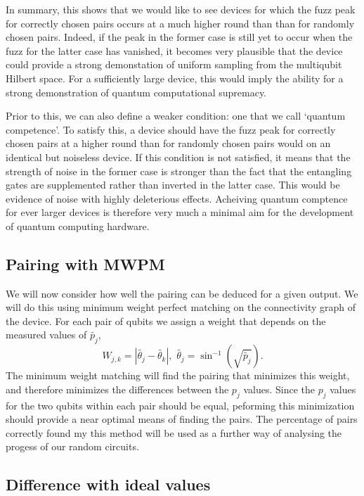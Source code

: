 \documentclass[aps,prl,twocolumn,showpacs,preprintnumbers]{revtex4-1}
\newcommand{\be}{\begin{equation}}
\newcommand{\ee}{\end{equation}}
\begin{document}
In summary, this shows that we would like to see devices for which the fuzz peak for correctly chosen pairs occurs at a much higher round than than for randomly chosen pairs. Indeed, if the peak in the former case is still yet to occur when the fuzz for the latter case has vanished, it becomes very plausible that the device could provide a strong demonstation of uniform sampling from the multiqubit Hilbert space. For a sufficiently large device, this would imply the ability for a strong demonstration of quantum computational supremacy.

Prior to this, we can also define a weaker condition: one that we call `quantum competence’. To satisfy this, a device should have the fuzz peak for correctly chosen pairs at a higher round than for randomly chosen pairs would on an identical but noiseless device. If this condition is not satisfied, it means that the strength of noise in the former case is stronger than the fact that the entangling gates are supplemented rather than inverted in the latter case. This would be evidence of noise with highly deleterious effects. Acheiving quantum comptence for ever larger devices is therefore very much a minimal aim for the development of quantum computing hardware.

\subsection{Pairing with MWPM}

We will now consider how well the pairing can be deduced for a given output. We will do this using minimum weight perfect matching on the connectivity graph of the device. For each pair of qubits we assign a weight that depends on the measured values of $\tilde{p_j}$,
\be \label{angle}
W_{j,k} = | \tilde{\theta_j} - \tilde{\theta_k} |, \,\, \tilde{\theta_j} = \sin^{-1}( \sqrt{\tilde{p_j}} ).
\ee
The minimum weight matching will find the pairing that minimizes this weight, and therefore minimizes the differences between the $p_j$ values. Since the $p_j$ values for the two qubits within each pair should be equal, peforming this minimization should provide a near optimal means of finding the pairs. The percentage of pairs correctly found my this method will be used as a further way of analysing the progess of our random circuits.

\subsection{Difference with ideal values}
\end{document}
